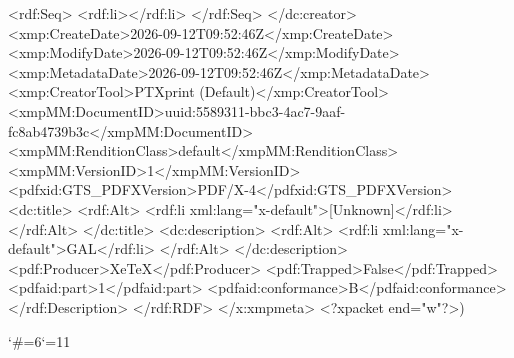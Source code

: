 {          <rdf:Seq>
            <rdf:li></rdf:li>
          </rdf:Seq>
        </dc:creator>
        <xmp:CreateDate>2026-09-12T09:52:46Z</xmp:CreateDate>
        <xmp:ModifyDate>2026-09-12T09:52:46Z</xmp:ModifyDate>
        <xmp:MetadataDate>2026-09-12T09:52:46Z</xmp:MetadataDate>
        <xmp:CreatorTool>PTXprint (Default)</xmp:CreatorTool>
        <xmpMM:DocumentID>uuid:5589311-bbc3-4ac7-9aaf-fc8ab4739b3c</xmpMM:DocumentID>
        <xmpMM:RenditionClass>default</xmpMM:RenditionClass>
        <xmpMM:VersionID>1</xmpMM:VersionID>
        <pdfxid:GTS_PDFXVersion>PDF/X-4</pdfxid:GTS_PDFXVersion>
        <dc:title>
          <rdf:Alt>
            <rdf:li xml:lang="x-default">[Unknown]</rdf:li>
          </rdf:Alt>
        </dc:title>
        <dc:description>
          <rdf:Alt>
            <rdf:li xml:lang="x-default">GAL</rdf:li>
          </rdf:Alt>
        </dc:description>
        <pdf:Producer>XeTeX</pdf:Producer>
        <pdf:Trapped>False</pdf:Trapped>
      <pdfaid:part>1</pdfaid:part>
      <pdfaid:conformance>B</pdfaid:conformance>
      </rdf:Description>
  </rdf:RDF>
</x:xmpmeta>
<?xpacket end="w"?>)}
\egroup
\catcode`\#=6\catcode`\@=11 \activ@tecustomch@rs







